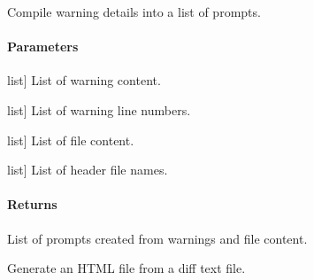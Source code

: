 \documentclass[letterpaper,10pt,english]{sphinxmanual}
\begin{document}
\begin{fulllineitems}
\label{\detokenize{main.utils:main.utils.utils.compaine_warn_details}}
\pysigstartsignatures
{}
\pysigstopsignatures
\sphinxAtStartPar
Compile warning details into a list of prompts.


\paragraph{Parameters}
\label{\detokenize{main.utils:parameters}}\begin{description}
\sphinxlineitem{warning\_content\_llist}{[}list{]}
\sphinxAtStartPar
List of warning content.

\sphinxlineitem{warning\_line\_number\_llist}{[}list{]}
\sphinxAtStartPar
List of warning line numbers.

\sphinxlineitem{file\_content\_list}{[}list{]}
\sphinxAtStartPar
List of file content.

\sphinxlineitem{header\_file\_name\_list}{[}list{]}
\sphinxAtStartPar
List of header file names.

\end{description}


\paragraph{Returns}
\label{\detokenize{main.utils:returns}}\begin{description}
\sphinxAtStartPar
List of prompts created from warnings and file content.

\end{description}

\end{fulllineitems}


\begin{fulllineitems}
\label{\detokenize{main.utils:main.utils.utils.generate_html_diff}}
\pysigstartsignatures
{}
\pysigstopsignatures
\sphinxAtStartPar
Generate an HTML file from a diff text file.

\end{fulllineitems}
\end{document}
